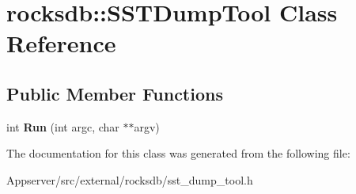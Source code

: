 \hypertarget{classrocksdb_1_1SSTDumpTool}{}\section{rocksdb\+:\+:S\+S\+T\+Dump\+Tool Class Reference}
\label{classrocksdb_1_1SSTDumpTool}
\subsection*{Public Member Functions}
\begin{DoxyCompactItemize}
\item 
int {\bfseries Run} (int argc, char $\ast$$\ast$argv)\hypertarget{classrocksdb_1_1SSTDumpTool_a21c99cc4e4a04fa40c3c6b62f85dde50}{}\label{classrocksdb_1_1SSTDumpTool_a21c99cc4e4a04fa40c3c6b62f85dde50}

\end{DoxyCompactItemize}


The documentation for this class was generated from the following file\+:\begin{DoxyCompactItemize}
\item 
Appserver/src/external/rocksdb/sst\+\_\+dump\+\_\+tool.\+h\end{DoxyCompactItemize}
